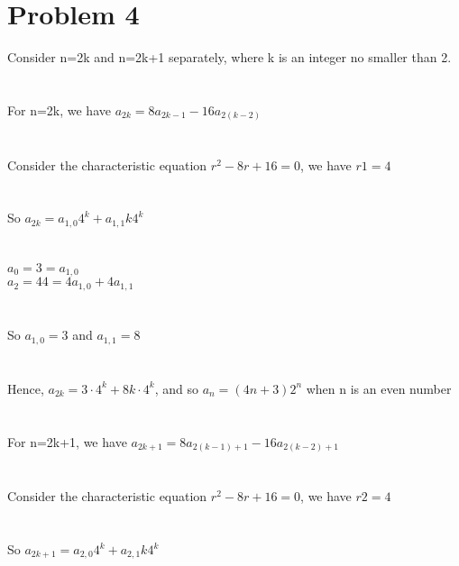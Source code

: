 \documentclass{article}
\begin{document}
\section{Problem 4}
Consider n=2k and n=2k+1 separately, where k is an integer no smaller than 2.\\
\\ \hspace*{\fill} \\
For n=2k, we have $a_{2k} = 8a_{2{k-1}} - 16a_{2(k-2)}$\\
\\ \hspace*{\fill} \\
Consider the characteristic equation $r^2 - 8r + 16 = 0$, we have $r1 = 4$\\
\\ \hspace*{\fill} \\
So $a_{2k} = a_{1,0}4^k + a_{1,1}k4^k$\\
\\ \hspace*{\fill} \\
$a_0 = 3 = a_{1,0}$\\
$a_2 = 44 = 4a_{1,0} + 4a_{1,1}$\\
\\ \hspace*{\fill} \\
So $a_{1,0} = 3$ and $a_{1,1} = 8$\\
\\ \hspace*{\fill} \\
Hence, $a_{2k} = 3 \cdot 4^k + 8k \cdot 4^k$, and so $a_n = (4n + 3) 2^n$ when n is an even number\\
\\ \hspace*{\fill} \\
For n=2k+1, we have $a_{2k+1} = 8a_{2(k-1) + 1} - 16a_{2(k-2) + 1}$\\
\\ \hspace*{\fill} \\
Consider the characteristic equation $r^2 - 8r + 16 = 0$, we have $r2 = 4$\\
\\ \hspace*{\fill} \\
So $a_{2k+1} = a_{2,0}4^k + a_{2,1}k4^k$\\
\\ \hspace*{\fill} \\
\end{document}
